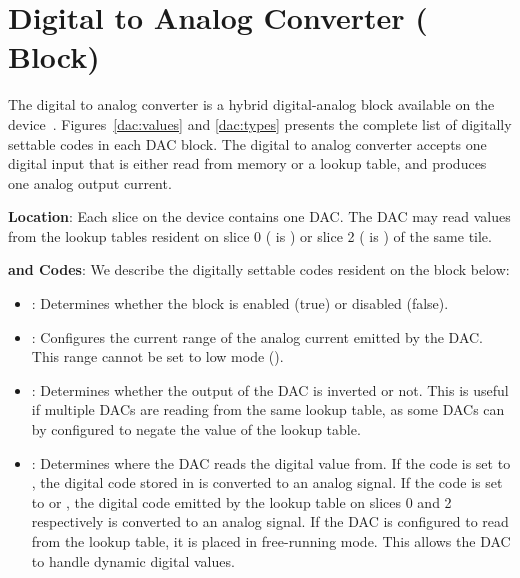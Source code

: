\chapter{Digital to Analog Converter ( Block)}

The digital to analog converter is a hybrid digital-analog block available on
the \hcdc device~\cite{dac.h}. Figures~\ref{dac:values} and \ref{dac:types}
presents the complete list of digitally settable codes in each DAC block. The
digital to analog converter accepts one digital input that is either read from
memory or a lookup table, and produces one analog output current. 

\noindent\textbf{Location}: Each slice on the \hcdc device contains one
DAC. The DAC may read values from the lookup tables resident on slice 0 
( is ) or slice 2 ( is )
of the same tile.

\noindent\textbf{\static and \dynamic Codes}: We describe the digitally settable
codes resident on the block below:

\begin{itemize}
\item{}: Determines whether the block is enabled (true) or disabled
  (false).
\item{}: Configures the current range of the analog current emitted by
  the DAC. This range cannot be set to low mode ().
  \item{}: Determines whether the output of the DAC is inverted or not.
    This is useful if multiple DACs are reading from the same lookup table, as
    some DACs can by configured to negate the value of the lookup table.
  \item{}: Determines where the DAC reads the digital value from. If
    the code is set to , the digital code stored in 
    is converted to an analog signal. If the code is set to  or
    , the digital code emitted by the lookup table on slices 0 and
    2 respectively is converted to an analog signal. If the DAC is configured to
    read from the lookup table, it is placed in free-running mode. This allows
    the DAC to handle dynamic digital values.  
\end{itemize}

